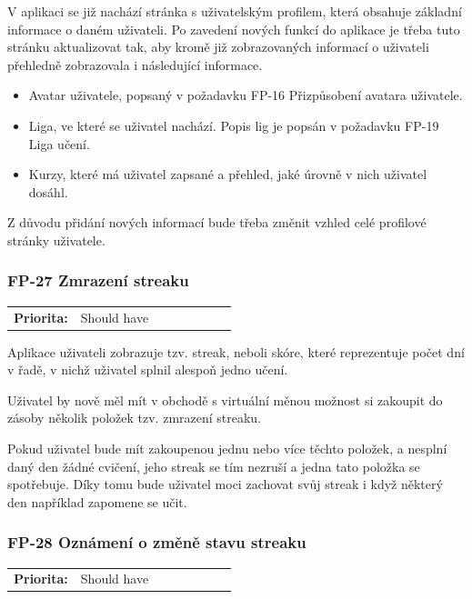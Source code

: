 V aplikaci se již nachází stránka s uživatelským profilem, která obsahuje základní informace o daném uživateli. Po zavedení nových funkcí do aplikace je třeba tuto stránku aktualizovat tak, aby kromě již zobrazovaných informací o uživateli přehledně zobrazovala i následující informace.

\begin{itemize}
    \item Avatar uživatele, popsaný v požadavku FP-16 Přizpůsobení avatara uživatele. %
    \item Liga, ve které se uživatel nachází. Popis lig je popsán v požadavku FP-19 Liga učení. %
    \item Kurzy, které má uživatel zapsané a přehled, jaké úrovně v nich uživatel dosáhl.
\end{itemize}

Z důvodu přidání nových informací bude třeba změnit vzhled celé profilové stránky uživatele.

\subsubsection{FP-27 Zmrazení streaku}

\begin{tabular}{lp{0.7\linewidth}}
    \textbf{Priorita:} & Should have \\
\end{tabular}

Aplikace uživateli zobrazuje tzv. streak, neboli skóre, které reprezentuje počet dní v řadě, v nichž uživatel splnil alespoň jedno učení.

Uživatel by nově měl mít v obchodě s virtuální měnou možnost si zakoupit do zásoby několik položek tzv. zmrazení streaku.

Pokud uživatel bude mít zakoupenou jednu nebo více těchto položek, a nesplní daný den žádné cvičení, jeho streak se tím nezruší a jedna tato položka se spotřebuje. Díky tomu bude uživatel moci zachovat svůj streak i když některý den například zapomene se učit.

\subsubsection{FP-28 Oznámení o změně stavu streaku}

\begin{tabular}{lp{0.7\linewidth}}
    \textbf{Priorita:} & Should have \\
\end{tabular}

